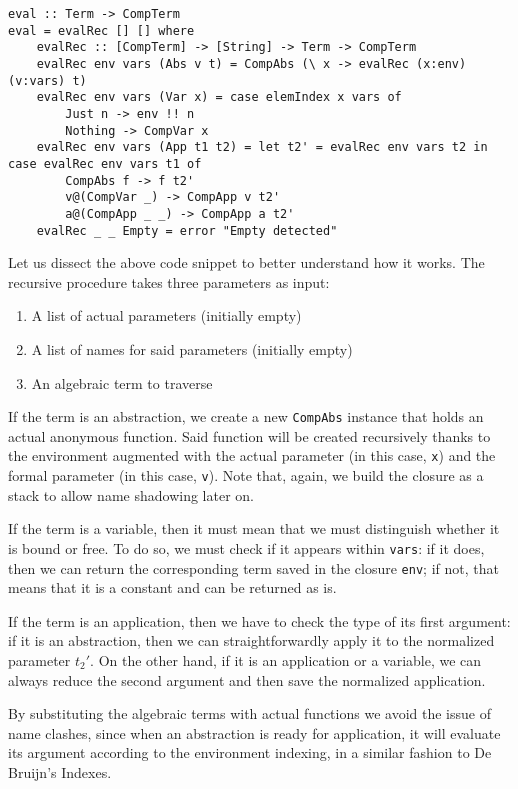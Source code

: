 \documentclass{article}
\begin{document}
\begin{lstlisting}
eval :: Term -> CompTerm
eval = evalRec [] [] where
    evalRec :: [CompTerm] -> [String] -> Term -> CompTerm
    evalRec env vars (Abs v t) = CompAbs (\ x -> evalRec (x:env) (v:vars) t)
    evalRec env vars (Var x) = case elemIndex x vars of
        Just n -> env !! n
        Nothing -> CompVar x
    evalRec env vars (App t1 t2) = let t2' = evalRec env vars t2 in case evalRec env vars t1 of
        CompAbs f -> f t2'
        v@(CompVar _) -> CompApp v t2'
        a@(CompApp _ _) -> CompApp a t2'
    evalRec _ _ Empty = error "Empty detected"
\end{lstlisting}

Let us dissect the above code snippet to better understand how it works. The recursive procedure takes three parameters as input:

\begin{enumerate}
    \item A list of actual parameters (initially empty)
    \item A list of names for said parameters (initially empty)
    \item An algebraic term to traverse
\end{enumerate}

If the term is an abstraction, we create a new \lstinline|CompAbs| instance that holds an actual anonymous function. Said function will be created recursively thanks to the environment augmented with the actual parameter (in this case, \lstinline|x|) and the formal parameter (in this case, \lstinline|v|). Note that, again, we build the closure as a stack to allow name shadowing later on.

If the term is a variable, then it must mean that we must distinguish whether it is bound or free. To do so, we must check if it appears within \lstinline|vars|: if it does, then we can return the corresponding term saved in the closure \lstinline|env|; if not, that means that it is a constant and can be returned as is.

If the term is an application, then we have to check the type of its first argument: if it is an abstraction, then we can straightforwardly apply it to the normalized parameter $t_2'$. On the other hand, if it is an application or a variable, we can always reduce the second argument and then save the normalized application.

By substituting the algebraic terms with actual functions we avoid the issue of name clashes, since when an abstraction is ready for application, it will evaluate its argument according to the environment indexing, in a similar fashion to De Bruijn's Indexes.
\end{document}
